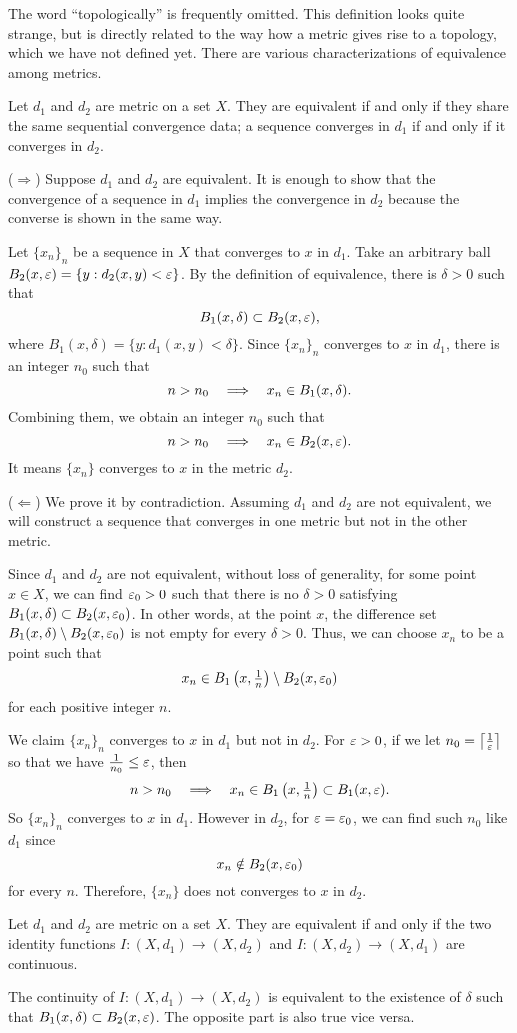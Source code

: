 \documentclass{../crs}
\begin{document}
The word ``topologically'' is frequently omitted.
This definition looks quite strange, but is directly related to the way how a metric gives rise to a topology, which we have not defined yet.
There are various characterizations of equivalence among metrics.

\begin{prop}
Let $d_1$ and $d_2$ are metric on a set $X$.
They are equivalent if and only if they share the same sequential convergence data; a sequence converges in $d_1$ if and only if it converges in $d_2$.
\end{prop}
\begin{pf}
($\Rightarrow$)
Suppose $d_1$ and $d_2$ are equivalent.
It is enough to show that the convergence of a sequence in $d_1$ implies the convergence in $d_2$ because the converse is shown in the same way.

Let $\{x_n\}_n$ be a sequence in $X$ that converges to $x$ in $d_1$.
Take an arbitrary ball $B_2(x,\varepsilon)=\{y:d_2(x,y)<\varepsilon\}$.
By the definition of equivalence, there is $\delta>0$ such that
\[B_1(x,\delta)\subset B_2(x,\varepsilon),\]
where $B_1(x,\delta)=\{y:d_1(x,y)<\delta\}$.
Since $\{x_n\}_n$ converges to $x$ in $d_1$, there is an integer $n_0$ such that
\[n>n_0\impl x_n\in B_1(x,\delta).\]
Combining them, we obtain an integer $n_0$ such that
\[n>n_0\impl x_n\in B_2(x,\e).\]
It means $\{x_n\}$ converges to $x$ in the metric $d_2$.

($\Leftarrow$)
We prove it by contradiction.
Assuming $d_1$ and $d_2$ are not equivalent, we will construct a sequence that converges in one metric but not in the other metric.

Since $d_1$ and $d_2$ are not equivalent, without loss of generality, for some point $x\in X$, we can find $\varepsilon_0>0$ such that there is no $\delta>0$ satisfying $B_1(x,\delta)\subset B_2(x,\varepsilon_0)$.
In other words, at the point $x$, the difference set $B_1(x,\delta)\setminus B_2(x,\varepsilon_0)$ is not empty for every $\delta>0$.
Thus, we can choose $x_n$ to be a point such that
\[x_n\in B_1\left(x,\tfrac1n\right)\setminus B_2(x,\varepsilon_0)\]
for each positive integer $n$.

We claim $\{x_n\}_n$ converges to $x$ in $d_1$ but not in $d_2$.
For $\varepsilon>0$, if we let $n_0=\left\lceil\frac1{\varepsilon}\right\rceil$ so that we have $\frac1{n_0}\le\varepsilon$, then
\[n>n_0\impl x_n\in B_1\left(x,\tfrac1n\right)\subset B_1(x,\e).\]
So $\{x_n\}_n$ converges to $x$ in $d_1$.
However in $d_2$, for $\varepsilon=\varepsilon_0$, we can find such $n_0$ like $d_1$ since
\[x_n\notin B_2(x,\varepsilon_0)\]
for every $n$.
Therefore, $\{x_n\}$ does not converges to $x$ in $d_2$.
\end{pf}
\begin{prop}
Let $d_1$ and $d_2$ are metric on a set $X$.
They are equivalent if and only if the two identity functions $I:(X,d_1)\to(X,d_2)$ and $I:(X,d_2)\to(X,d_1)$ are continuous.
\end{prop}
\begin{pf}
The continuity of $I:(X,d_1)\to(X,d_2)$ is equivalent to the existence of $\delta$ such that $B_1(x,\delta)\subset B_2(x,\varepsilon)$.
The opposite part is also true vice versa.
\end{pf}
\end{document}
